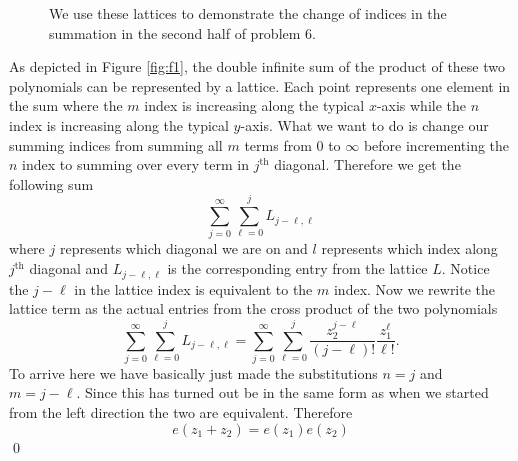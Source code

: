 \documentclass[10pt]{amsart}
\theoremstyle{nonumberplain}
\begin{document}
\begin{enumerate}[label={\bf {\arabic*}:}]
\begin{figure}[h]
  \caption{We use these lattices to demonstrate the change of indices in the summation in the second half of problem 6.}
\end{figure}
As depicted in Figure \ref{fig:f1}, the double infinite sum of the product of these two polynomials can be represented by a lattice.
Each point represents one element in the sum where the $m$ index is increasing along the typical $x$-axis while the $n$ index is increasing along the typical $y$-axis.
What we want to do is change our summing indices from summing all $m$ terms from $0$ to $\infty$ before incrementing the $n$ index to summing over every term in $j^\text{th}$ diagonal.
Therefore we get the following sum
$$\sum_{j=0}^{\infty} \sum_{\ell = 0}^{j} L_{j-\ell, \ell}$$
where $j$ represents which diagonal we are on and $l$ represents which index along $j^{\text{th}}$ diagonal and $L_{j-\ell, \ell}$ is the corresponding entry from the lattice $L$.
Notice the $j-\ell$ in the lattice index is equivalent to the $m$ index.
Now we rewrite the lattice term as the actual entries from the cross product of the two polynomials
$$\sum_{j=0}^{\infty} \sum_{\ell = 0}^{j} L_{j-\ell, \ell} = \sum_{j=0}^{\infty} \sum_{\ell = 0}^{j} \frac{z_2^{j-\ell}}{(j - \ell)!} \frac{z_1^{\ell}}{\ell!}. $$
To arrive here we have basically just made the substitutions $n = j$ and $m = j - \ell$.
Since this has turned out be in the same form as when we started from the left direction the two are equivalent.
Therefore
$$ e\left(z_1+z_2\right)=e\left(z_1\right) e\left(z_2\right) $$
\qed
  

\end{enumerate}
\end{document}
